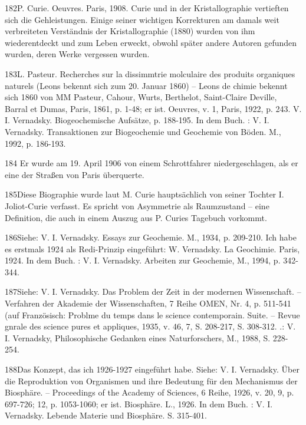 \documentclass[11pt,a4paper]{book}
\begin{document}
182P. Curie. Oeuvres. Paris, 1908. Curie und in der Kristallographie vertieften sich die Gehleistungen. Einige seiner wichtigen Korrekturen am damals weit verbreiteten Verständnis der Kristallographie (1880) wurden von ihm wiederentdeckt und zum Leben erweckt, obwohl später andere Autoren gefunden wurden, deren Werke vergessen wurden.



183L. Pasteur. Recherches sur la dissimmtrie molculaire des produits organiques naturels (Leons bekennt sich zum 20. Januar 1860) -- Leons de chimie bekennt sich 1860 von MM Pasteur, Cahour, Wurts, Berthelot, Saint-Claire Deville, Barral et Dumas, Paris, 1861, p. 1-48; er ist. Oeuvres, v. 1, Paris, 1922, p. 243. V. I. Vernadsky. Biogeochemische Aufsätze, p. 188-195. In dem Buch. : V. I. Vernadsky. Transaktionen zur Biogeochemie und Geochemie von Böden. M., 1992, p. 186-193.



184 Er wurde am 19. April 1906 von einem Schrottfahrer niedergeschlagen, als er eine der Straßen von Paris überquerte.



185Diese Biographie wurde laut M. Curie hauptsächlich von seiner Tochter I. Joliot-Curie verfasst. Es spricht von Asymmetrie als Raumzustand -- eine Definition, die auch in einem Auszug aus P. Curies Tagebuch vorkommt.



186Siehe: V. I. Vernadsky. Essays zur Geochemie. M., 1934, p. 209-210. Ich habe es erstmals 1924 als Redi-Prinzip eingeführt: W. Vernadsky. La Geochimie. Paris, 1924. In dem Buch. : V. I. Vernadsky. Arbeiten zur Geochemie, M., 1994, p. 342-344.



187Siehe: V. I. Vernadsky. Das Problem der Zeit in der modernen Wissenschaft. -- Verfahren der Akademie der Wissenschaften, 7 Reihe OMEN, Nr. 4, p. 511-541 (auf Französisch: Problme du temps dans le science contemporain. Suite. -- Revue gnrale des science pures et appliques, 1935, v. 46, 7, S. 208-217, S. 308-312. .: V. I. Vernadsky, Philosophische Gedanken eines Naturforschers, M., 1988, S. 228-254.



188Das Konzept, das ich 1926-1927 eingeführt habe. Siehe: V. I. Vernadsky. Über die Reproduktion von Organismen und ihre Bedeutung für den Mechanismus der Biosphäre. -- Proceedings of the Academy of Sciences, 6 Reihe, 1926, v. 20, 9, p. 697-726; 12, p. 1053-1060; er ist. Biosphäre. L., 1926. In dem Buch. : V. I. Vernadsky. Lebende Materie und Biosphäre. S. 315-401.
\end{document}
